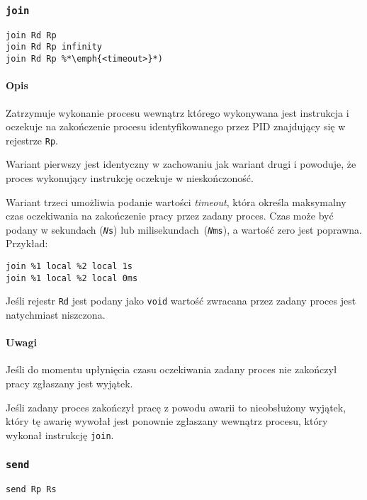 \subsubsection{\texttt{join}}

\begin{lstlisting}
join Rd Rp
join Rd Rp infinity
join Rd Rp %*\emph{<timeout>}*)
\end{lstlisting}

\paragraph*{Opis} Zatrzymuje wykonanie procesu wewnątrz którego wykonywana jest
instrukcja i oczekuje na zakończenie procesu identyfikowanego przez PID
znajdujący się w rejestrze \texttt{Rp}.

Wariant pierwszy jest identyczny w zachowaniu jak wariant drugi i powoduje, że
proces wykonujący instrukcję oczekuje w nieskończoność.

Wariant trzeci umożliwia podanie wartości \emph{timeout}, która określa
maksymalny czas oczekiwania na zakończenie pracy przez zadany proces. Czas może
być podany w sekundach (\texttt{\emph{N}s}) lub
milisekundach~(\texttt{\emph{N}ms}), a wartość zero jest poprawna. Przykład:
\begin{lstlisting}
join %1 local %2 local 1s
join %1 local %2 local 0ms
\end{lstlisting}

Jeśli rejestr \texttt{Rd} jest podany jako \texttt{void} wartość zwracana przez
zadany proces jest natychmiast niszczona.

\paragraph*{Uwagi}

Jeśli do momentu upłynięcia czasu oczekiwania zadany proces nie zakończył pracy
zgłaszany jest wyjątek.

Jeśli zadany proces zakończył pracę z powodu awarii to nieobsłużony wyjątek,
który tę awarię wywołał jest ponownie zgłaszany wewnątrz procesu, który wykonał
instrukcję \texttt{join}.

\subsubsection{\texttt{send}}

\begin{lstlisting}
send Rp Rs
\end{lstlisting}

